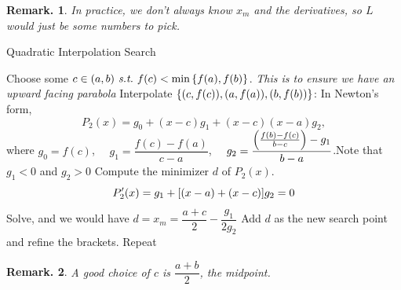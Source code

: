 \documentclass[12pt, a4paper]{article}
\newtheorem{rmk}{Remark.}[section]
\def\st{\emph{\ s.t.\ }}
\begin{document}
\begin{rmk}
		In practice, we don't always know $x_m$ and the derivatives, so $L$ would just be some numbers to pick.	
	\end{rmk}
\begin{algorithm}
	\caption{Quadratic Interpolation Search}
	Choose some $c\in(a,b)\st f(c)<\min\qty{f(a), f(b)}$. \textit{This is to ensure we have an upward facing parabola}\;
	Interpolate $\qty{(c,f(c)), (a, f(a)), (b, f(b))}$: \newline In Newton's form, \[P_2(x)=g_0+(x-c)g_1+(x-c)(x-a)g_2,\] where $g_0=f(c)$, $\quad g_1=\dfrac{f(c)-f(a)}{c-a}$, $\quad g_2=\dfrac{\qty(\frac{f(b)-f(c)}{b-c})-g_1}{b-a}$.\newline Note that $g_1<0$ and $g_2>0$\;
	Compute the minimizer $d$ of $P_2(x)$. \[P_2'(x)=g_1+\qty[(x-a)+(x-c)]g_2=0\] Solve, and we would have $d=x_m=\dfrac{a+c}{2}-\dfrac{g_1}{2g_2}$\;
	Add $d$ as the new search point and refine the brackets. Repeat\;
\end{algorithm}
\begin{rmk} A good choice of $c$ is $\dfrac{a+b}{2}$, the midpoint. \end{rmk}
\end{document}
